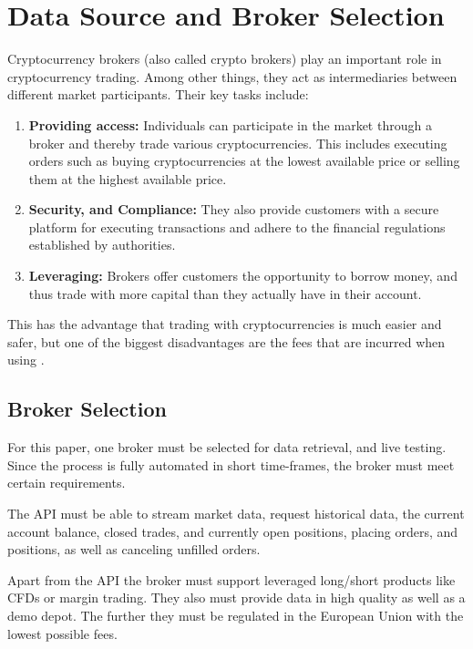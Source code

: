 \section{Data Source and Broker Selection}

Cryptocurrency brokers (also called crypto brokers) play an important role in cryptocurrency trading. Among other things, they act as intermediaries between different market participants. Their key tasks include:

\begin{enumerate}
    \item \textbf{Providing access:} Individuals can participate in the market through a broker and thereby trade various cryptocurrencies. This includes executing orders such as buying cryptocurrencies at the lowest available price or selling them at the highest available price.
    \item \textbf{Security, and Compliance:} They also provide customers with a secure platform for executing transactions and adhere to the financial regulations established by authorities.
    \item \textbf{Leveraging:} Brokers offer customers the opportunity to borrow money, and thus trade with more capital than they actually have in their account.
\end{enumerate}


This has the advantage that trading with cryptocurrencies is much easier and safer, but one of the biggest disadvantages are the fees that are incurred when using \cite{broker-investing}.

\subsection{Broker Selection}
\label{chap:broker-selection}

For this paper, one broker must be selected for data retrieval, and live testing. Since the process is fully automated in short time-frames, the broker must meet certain requirements.

The API must be able to stream market data, request historical data, the current account balance, closed trades, and currently open positions, placing orders, and positions, as well as canceling unfilled orders.

Apart from the API the broker must support leveraged long/short products like CFDs or margin trading. They also must provide data in high quality as well as a demo depot. The further they must be regulated in the European Union with the lowest possible fees.

